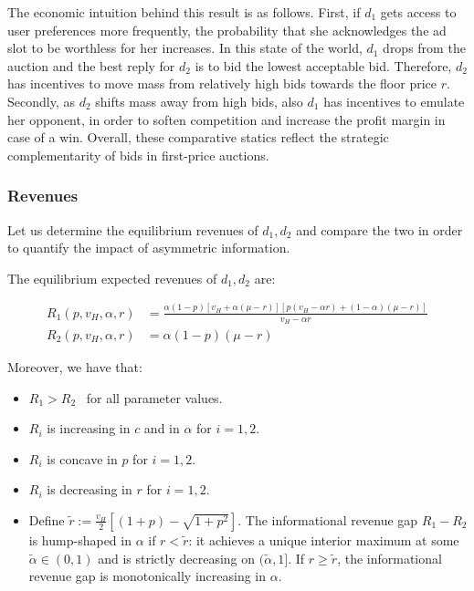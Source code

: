 \noindent The economic intuition behind this result is as follows. First, if $ d_1 $ gets access to user preferences more frequently, the probability that she acknowledges the ad slot to be worthless for her increases. In this state of the world, $ d_1 $ drops from the auction and the best reply for $ d_2 $ is to bid the lowest acceptable bid. Therefore, $ d_2 $ has incentives to move mass from relatively high bids towards the floor price $ r $. Secondly, as $ d_2 $ shifts mass away from high bids, also $ d_1 $ has incentives to emulate her opponent, in order to soften competition and increase the profit margin in case of a win. Overall, these comparative statics reflect the strategic complementarity of bids in first-price auctions. \par

\subsubsection{Revenues}

\noindent Let us determine the equilibrium revenues of $ d_1, d_2 $ and compare the two in order to quantify the impact of asymmetric information.

\begin{cor}\label{revenues-comparative}
The equilibrium expected revenues of $ d_1, d_2 $ are:

\begin{align*}
 R_1 (p, v_H, \alpha, r) &= \frac{\alpha (1 - p)\left[ v_H+ \alpha (\mu - r) \right] \left[ p(v_H - \alpha r) + (1 - \alpha)(\mu - r) \right]}{v_H - \alpha r} \\[5pt]
 R_2(p, v_H, \alpha, r) &= \alpha (1 - p) (\mu - r)
\end{align*}

\noindent Moreover, we have that:
\begin{itemize}
    \item[-] $ R_1 > R_2 $ \ for all parameter values.

    

    \item[-] $ R_i $ is increasing in $ c $ and in $ \alpha $ for $ i = 1,2 $.

    

    \item[-] $ R_i $ is concave in $ p $ for $ i = 1,2 $.

    

    \item[-] $ R_i $ is decreasing in $ r $ for $ i = 1,2 $.

    

    \item[-] Define $\tilde{r} := \frac{v_H}{2}\left[(1+p) - \sqrt{1+p^2}\right]$. The informational revenue gap $R_1 - R_2$ is hump-shaped in $\alpha$ if $r < \tilde{r}$: it achieves a unique interior maximum at some $\tilde{\alpha} \in (0,1)$ and is strictly decreasing on $(\tilde{\alpha}, 1]$. If $r \geq \tilde{r}$, the informational revenue gap is monotonically increasing in $\alpha$.
\end{itemize}
\end{cor}

